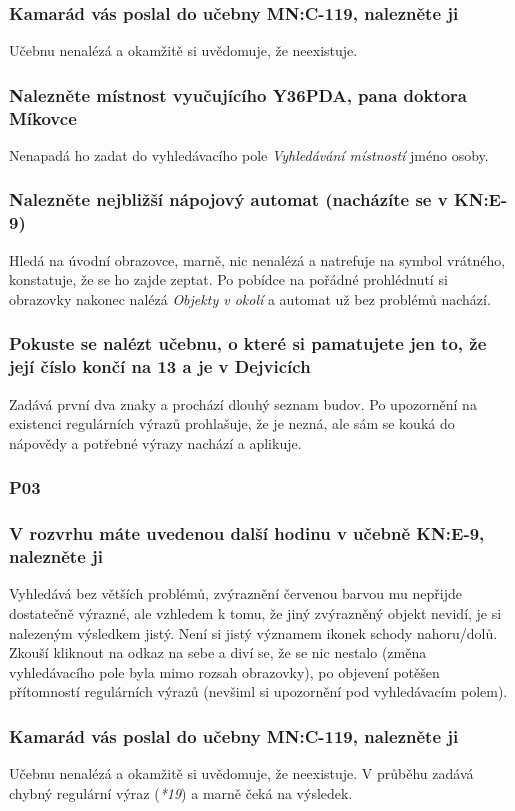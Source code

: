 \subsubsection*{Kamarád vás poslal do učebny MN:C-119, nalezněte ji}
Učebnu nenalézá a okamžitě si uvědomuje, že neexistuje.
\subsubsection*{Nalezněte místnost vyučujícího Y36PDA, pana doktora Míkovce}
Nenapadá ho zadat do vyhledávacího pole \emph{Vyhledávání místností} jméno osoby.
\subsubsection*{Nalezněte nejbližší nápojový automat (nacházíte se v KN:E-9)}
Hledá na úvodní obrazovce, marně, nic nenalézá a natrefuje na symbol vrátného, konstatuje, že se ho zajde zeptat. Po pobídce na pořádné prohlédnutí si obrazovky nakonec nalézá \emph{Objekty v okolí} a automat už bez problémů nachází.
\subsubsection*{Pokuste se nalézt učebnu, o které si pamatujete jen to, že její číslo končí na 13 a je v Dejvicích}
Zadává první dva znaky a prochází dlouhý seznam budov. Po upozornění na existenci regulárních výrazů prohlašuje, že je nezná, ale sám se kouká do nápovědy a potřebné výrazy nachází a aplikuje.

\subsubsection{P03}
\subsubsection*{V rozvrhu máte uvedenou další hodinu v učebně KN:E-9, nalezněte ji}
Vyhledává bez větších problémů, zvýraznění červenou barvou mu nepřijde dostatečně výrazné, ale vzhledem k tomu, že jiný zvýrazněný objekt nevidí, je si nalezeným výsledkem jistý. Není si jistý významem ikonek schody nahoru/dolů. Zkouší kliknout na odkaz na sebe a diví se, že se nic nestalo (změna vyhledávacího pole byla mimo rozsah obrazovky), po objevení potěšen přítomností regulárních výrazů (nevšiml si upozornění pod vyhledávacím polem).
\subsubsection*{Kamarád vás poslal do učebny MN:C-119, nalezněte ji}
Učebnu nenalézá a okamžitě si uvědomuje, že neexistuje. V průběhu zadává chybný regulární výraz (\emph{*19}) a marně čeká na výsledek.

